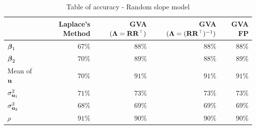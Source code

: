 \begin{table}
	\begin{tabular}{|l|rrrr|}
		\hline
		                   & Laplace's Method & GVA $({\boldsymbol \Lambda} = {\bf R} {\bf R}^\top)$ & GVA $({\boldsymbol \Lambda} = ({\bf R} {\bf R}^\top)^{-1})$ & GVA FP \\
		\hline
		${\boldsymbol \beta}_1$         & $67\%$             & $88\%$                            & $88\%$                                   & $88\%$   \\
		${\boldsymbol \beta}_2$         & $70\%$             & $89\%$                            & $88\%$                                   & $89\%$   \\
		Mean of ${\bf u}$      & $70\%$             & $91\%$                            & $91\%$                                   & $91\%$   \\
		$\sigma^2_{{\bf u}_1}$ & $71\%$             & $73\%$                            & $73\%$                                   & $73\%$   \\
		$\sigma^2_{{\bf u}_2}$ & $68\%$             & $69\%$                            & $69\%$                                   & $69\%$   \\
		$\rho$             & $91\%$             & $90\%$                            & $90\%$                                   & $90\%$   \\
		\hline
	\end{tabular}
	\caption{Table of accuracy - Random slope model}
	\label{tab:accuracy_slope}
\end{table}
		
		
